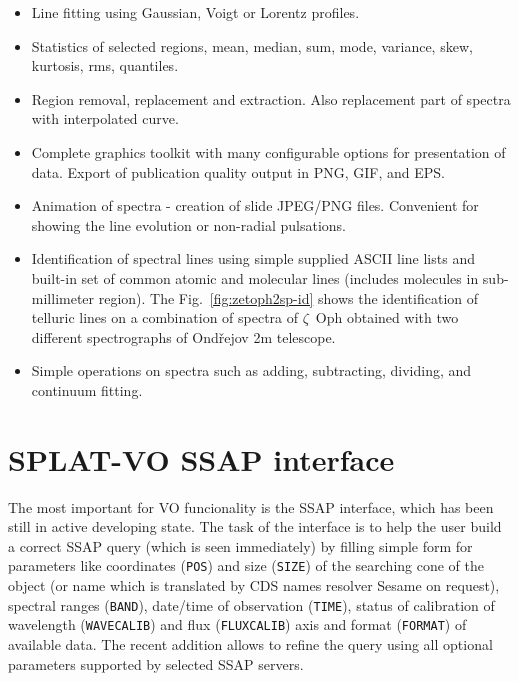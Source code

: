 \documentclass[final,authoryear,5p,times,twocolumn]{elsarticle}
\begin{document}
\begin{itemize}
\item Line fitting using Gaussian, Voigt or Lorentz profiles.

\item Statistics of selected regions, mean, median, sum, mode, variance, skew,
      kurtosis, rms, quantiles.

\item Region removal, replacement and extraction. Also replacement part of
spectra  with interpolated curve.

\item Complete graphics toolkit with many configurable options for
  presentation of data. Export of publication quality output in PNG,
  GIF, and EPS.

\item Animation of spectra - creation of slide JPEG/PNG files. Convenient
  for showing the line evolution or non-radial pulsations.

\item Identification of spectral lines using simple supplied ASCII line lists and
 built-in set of common  atomic and molecular lines (includes molecules in sub-millimeter
 region). The Fig.~\ref{fig:zetoph2sp-id} shows the identification of telluric lines on a
 combination of spectra of $\zeta$~Oph obtained with two different spectrographs of Ond\v{r}ejov 2m
telescope.

\item Simple operations on spectra such as adding, subtracting,
  dividing, and continuum fitting.

\end{itemize}


\section{SPLAT-VO SSAP interface}

The most important for VO funcionality is the SSAP interface, which
has been still in active developing state.  The task of the interface
is to help the user build a correct SSAP query (which is seen
immediately) by filling simple form for parameters like coordinates
(\texttt{POS}) and size (\texttt{SIZE}) of the searching cone of the
object (or name which is translated by CDS names resolver Sesame on
request), spectral ranges (\texttt{BAND}), date/time of observation
(\texttt{TIME}), status of calibration of wavelength
(\texttt{WAVECALIB}) and flux (\texttt{FLUXCALIB}) axis and format
(\texttt{FORMAT}) of available data.  The recent addition allows to
refine the query using all optional parameters supported by selected
SSAP servers.
\end{document}
